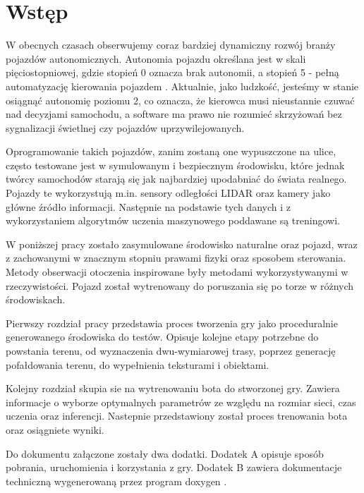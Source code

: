 \chapter*{Wstęp}
W obecnych czasach obserwujemy coraz bardziej dynamiczny rozwój branży pojazdów autonomicznych. Autonomia pojazdu określana jest w skali pięciostopniowej, gdzie stopień 0 oznacza brak autonomii, a stopień 5 - pełną automatyzację kierowania pojazdem \cite{SAE}. Aktualnie, jako ludzkość, jesteśmy w stanie osiągnąć autonomię poziomu 2, co oznacza, że kierowca musi nieustannie czuwać nad decyzjami samochodu, a software ma prawo nie rozumieć skrzyżowań bez sygnalizacji świetlnej czy pojazdów uprzywilejowanych.

Oprogramowanie takich pojazdów, zanim zostaną one wypuszczone na ulice, często testowane jest w symulowanym i bezpiecznym środowisku, które jednak twórcy samochodów starają się jak najbardziej upodabniać do świata realnego. Pojazdy te wykorzystują m.in. sensory odległości LIDAR\cite{Lidar} oraz kamery jako główne źródło informacji. Następnie na podstawie tych danych i z wykorzystaniem algorytmów uczenia maszynowego poddawane są treningowi.

W poniższej pracy zostało zasymulowane środowisko naturalne oraz pojazd, wraz z zachowanymi w znacznym stopniu prawami fizyki oraz sposobem sterowania. Metody obserwacji otoczenia inspirowane były metodami wykorzystywanymi w rzeczywistości. Pojazd został wytrenowany do poruszania się po torze w różnych środowiskach.

Pierwszy rozdział pracy przedstawia proces tworzenia gry jako proceduralnie generowanego środowiska do testów. Opisuje kolejne etapy potrzebne do powstania terenu, od wyznaczenia dwu-wymiarowej trasy, poprzez generację pofałdowania terenu, do wypełnienia teksturami i obiektami.

Kolejny rozdział skupia sie na wytrenowaniu bota do stworzonej gry. Zawiera informacje o wyborze optymalnych parametrów ze względu na rozmiar sieci, czas uczenia oraz inferencji. Nastepnie przedstawiony został proces trenowania bota oraz osiągniete wyniki.

Do dokumentu załączone zostały dwa dodatki. Dodatek A opisuje sposób pobrania, uruchomienia i korzystania z gry. Dodatek B zawiera dokumentacje techniczną wygenerowaną przez program doxygen \cite{Doxygen}.
